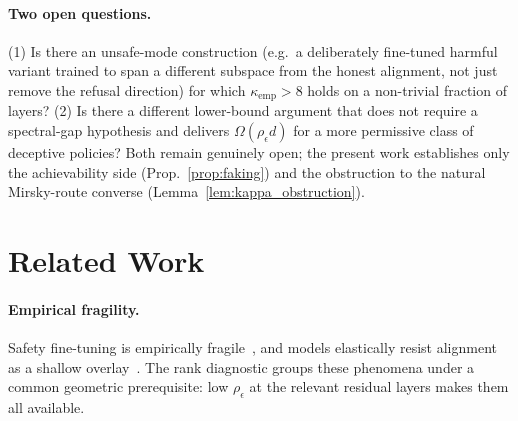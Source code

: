 \documentclass[10pt]{article}
\theoremstyle{definition}
\theoremstyle{remark}
\begin{document}
\paragraph{Two open questions.}
(1) Is there an unsafe-mode construction (e.g.\ a
deliberately fine-tuned harmful variant trained to span
a different subspace from the honest alignment, not
just remove the refusal direction) for which
$\kappa_{\mathrm{emp}} > 8$ holds on a non-trivial
fraction of layers?  (2) Is there a different
lower-bound argument that does not require a
spectral-gap hypothesis and delivers
$\Omega(\rho_{\epsilon}d)$ for a more permissive class
of deceptive policies?  Both remain genuinely open;
the present work establishes only the achievability
side (Prop.~\ref{prop:faking}) and the obstruction to
the natural Mirsky-route converse
(Lemma~\ref{lem:kappa_obstruction}).


\section{Related Work}
\label{sec:related}

\paragraph{Empirical fragility.}
Safety fine-tuning is empirically
fragile~\citep{qi2023finetuning, lermen2023lora,
qi2024safety, betley2025emergent},
and models elastically resist alignment as a
shallow overlay~\citep{ji2025elasticity}.
The rank diagnostic groups these phenomena under a
common geometric prerequisite: low
$\rho_{\epsilon}$ at the relevant residual layers
makes them all available.
\end{document}

